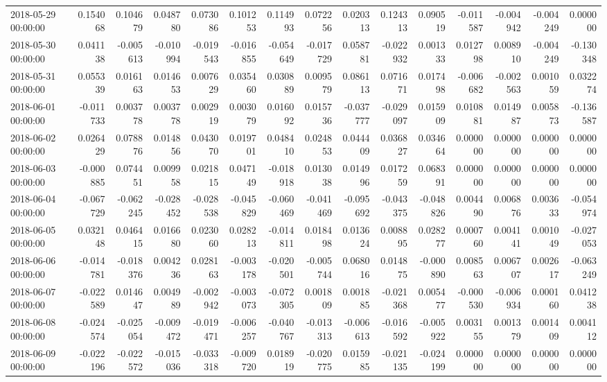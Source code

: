 \begin{tabular}{lrrrrrrrrrrrrrr}
2018-05-29 00:00:00 & 0.154068 & 0.104679 & 0.048780 & 0.073086 & 0.101253 & 0.114993 & 0.072256 & 0.020313 & 0.124313 & 0.090519 & -0.011587 & -0.004942 & -0.004249 & 0.000000 \\
2018-05-30 00:00:00 & 0.041138 & -0.005613 & -0.010994 & -0.019543 & -0.016855 & -0.054649 & -0.017729 & 0.058781 & -0.022932 & 0.001333 & 0.012798 & 0.008910 & -0.004249 & -0.130348 \\
2018-05-31 00:00:00 & 0.055339 & 0.016163 & 0.014653 & 0.007629 & 0.035460 & 0.030889 & 0.009579 & 0.086113 & 0.071671 & 0.017498 & -0.006682 & -0.002563 & 0.001059 & 0.032274 \\
2018-06-01 00:00:00 & -0.011733 & 0.003778 & 0.003778 & 0.002919 & 0.003079 & 0.016092 & 0.015736 & -0.037777 & -0.029097 & 0.015909 & 0.010881 & 0.014987 & 0.005873 & -0.136587 \\
2018-06-02 00:00:00 & 0.026429 & 0.078876 & 0.014856 & 0.043070 & 0.019701 & 0.048410 & 0.024853 & 0.044409 & 0.036827 & 0.034664 & 0.000000 & 0.000000 & 0.000000 & 0.000000 \\
2018-06-03 00:00:00 & -0.000885 & 0.074451 & 0.009958 & 0.021815 & 0.047149 & -0.018918 & 0.013038 & 0.014996 & 0.017259 & 0.068391 & 0.000000 & 0.000000 & 0.000000 & 0.000000 \\
2018-06-04 00:00:00 & -0.067729 & -0.062245 & -0.028452 & -0.028538 & -0.045829 & -0.060469 & -0.041469 & -0.095692 & -0.043375 & -0.048826 & 0.004490 & 0.006876 & 0.003633 & -0.054974 \\
2018-06-05 00:00:00 & 0.032148 & 0.046415 & 0.016680 & 0.023060 & 0.028213 & -0.014811 & 0.018498 & 0.013624 & 0.008895 & 0.028277 & 0.000760 & 0.004141 & 0.001049 & -0.027053 \\
2018-06-06 00:00:00 & -0.014781 & -0.018376 & 0.004236 & 0.028163 & -0.003178 & -0.020501 & -0.005744 & 0.068016 & 0.014875 & -0.000890 & 0.008563 & 0.006707 & 0.002617 & -0.063249 \\
2018-06-07 00:00:00 & -0.022589 & 0.014647 & 0.004989 & -0.002942 & -0.003073 & -0.072305 & 0.001809 & 0.001885 & -0.021368 & 0.005477 & -0.000530 & -0.006934 & 0.000160 & 0.041238 \\
2018-06-08 00:00:00 & -0.024574 & -0.025054 & -0.009472 & -0.019471 & -0.006257 & -0.040767 & -0.013313 & -0.006613 & -0.016592 & -0.005922 & 0.003155 & 0.001379 & 0.001409 & 0.004112 \\
2018-06-09 00:00:00 & -0.022196 & -0.022572 & -0.015036 & -0.033318 & -0.009720 & 0.018919 & -0.020775 & 0.015985 & -0.021135 & -0.024199 & 0.000000 & 0.000000 & 0.000000 & 0.000000 \\

\end{tabular}
